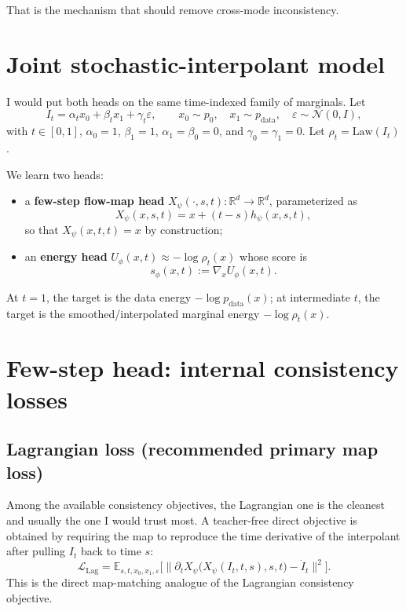 \documentclass[11pt]{article}
\newcommand{\E}{\mathbb{E}}
\newcommand{\R}{\mathbb{R}}
\newcommand{\Law}{\mathrm{Law}}
\newcommand{\grad}{\nabla}
\newcommand{\flow}{X_{\psi}}
\newcommand{\energy}{U_{\phi}}
\begin{document}
That is the mechanism that should remove cross-mode inconsistency.

\section{Joint stochastic-interpolant model}

I would put both heads on the same time-indexed family of marginals. Let
\begin{equation}
I_t = \alpha_t x_0 + \beta_t x_1 + \gamma_t \varepsilon,
\qquad x_0 \sim p_0,
\quad x_1 \sim p_{\mathrm{data}},
\quad \varepsilon \sim \mathcal{N}(0,I),
\label{eq:interpolant}
\end{equation}
with $t \in [0,1]$, $\alpha_0=1$, $\beta_1=1$, $\alpha_1=\beta_0=0$, and $\gamma_0=\gamma_1=0$. Let $\rho_t = \Law(I_t)$.

We learn two heads:
\begin{itemize}[itemsep=0.25em,topsep=0.25em]
    \item a \textbf{few-step flow-map head} $\flow(\cdot,s,t): \R^d \to \R^d$, parameterized as
    \begin{equation}
    \flow(x,s,t) = x + (t-s) h_{\psi}(x,s,t),
    \label{eq:flow_parameterization}
    \end{equation}
    so that $\flow(x,t,t)=x$ by construction;
    \item an \textbf{energy head} $\energy(x,t) \approx -\log \rho_t(x)$ whose score is
    \begin{equation}
    s_{\phi}(x,t) := \grad_x \energy(x,t).
    \label{eq:score_from_energy}
    \end{equation}
\end{itemize}

At $t=1$, the target is the data energy $-\log p_{\mathrm{data}}(x)$; at intermediate $t$, the target is the smoothed/interpolated marginal energy $-\log \rho_t(x)$.

\section{Few-step head: internal consistency losses}

\subsection{Lagrangian loss (recommended primary map loss)}

Among the available consistency objectives, the Lagrangian one is the cleanest and usually the one I would trust most. A teacher-free direct objective is obtained by requiring the map to reproduce the time derivative of the interpolant after pulling $I_t$ back to time $s$:
\begin{equation}
\mathcal{L}_{\mathrm{Lag}}
=
\E_{s,t,x_0,x_1,\varepsilon}
\Big[
\big\| \partial_t \flow\big(\flow(I_t,t,s),s,t\big) - \dot I_t \big\|^2
\Big].
\label{eq:L_lag}
\end{equation}
This is the direct map-matching analogue of the Lagrangian consistency objective.
\end{document}
